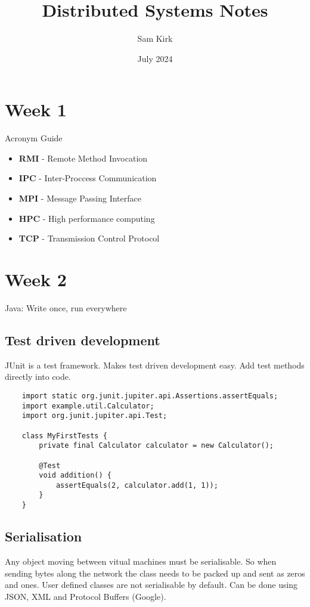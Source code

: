 \documentclass[12pt, letterpaper]{article}
\title{Distributed Systems Notes}
\author{Sam Kirk}
\date{July 2024}
\begin{document}
\maketitle

\section*{Week 1}
Acronym Guide 
\begin{itemize}
    \item \textbf{RMI} - Remote Method Invocation
    \item \textbf{IPC} - Inter-Proccess Communication
    \item \textbf{MPI} - Message Passing Interface 
    \item \textbf{HPC} - High performance computing
    \item \textbf{TCP} - Transmission Control Protocol
\end{itemize}

\section*{Week 2}
Java: Write once, run everywhere 

\subsection*{Test driven development}
JUnit is a test framework. 
Makes test driven development easy.
Add test methods directly into code.

\begin{lstlisting}
    import static org.junit.jupiter.api.Assertions.assertEquals;
    import example.util.Calculator;
    import org.junit.jupiter.api.Test;

    class MyFirstTests {
        private final Calculator calculator = new Calculator();

        @Test 
        void addition() {
            assertEquals(2, calculator.add(1, 1));
        }
    }
\end{lstlisting}

\subsection{Serialisation}
Any object moving between vitual machines must be serialisable.
So when sending bytes along the network 
the class needs to be packed up and sent as zeros and ones.
User defined classes are not serialisable by default.
Can be done using JSON, XML and Protocol Buffers (Google).
\end{document}
